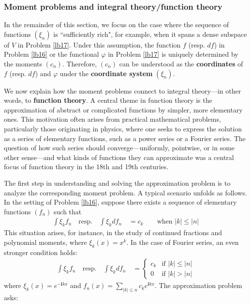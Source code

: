 \documentclass[12pt,b5paper,notitlepage]{article}
\theoremstyle{definition}
\theoremstyle{plain}
\newcommand{\im}{\mathbf{i}}
\numberwithin{equation}{section}
\begin{document}
\subsubsection{Moment problems and integral theory/function theory}\label{lb19}


In the remainder of this section, we focus on the case where the sequence of functions $(\xi_n)$ is ``sufficiently rich", for example, when it spans a dense subspace of $V$ in Problem \ref{lb17}. Under this assumption, the function $f$ (resp. $df$) in Problem \ref{lb16} or the functional $\varphi$ in Problem \ref{lb17} is uniquely determined by the moments $(c_n)$. Therefore, $(c_n)$ can be understood as the \textbf{coordinates} of $f$ (resp. $df$) and $\varphi$ under the \textbf{coordinate system} $(\xi_n)$.


We now explain how the moment problems connect to integral theory---in other words, to \textbf{function theory}. A central theme in function theory is the approximation of abstract or complicated functions by simpler, more elementary ones. This motivation often arises from practical mathematical problems, particularly those originating in physics, where one seeks to express the solution as a series of elementary functions, such as a power series or a Fourier series. The question of how such series should converge---uniformly, pointwise, or in some other sense---and what kinds of functions they can approximate was a central focus of function theory in the 18th and 19th centuries.


The first step in understanding and solving the approximation problem is to analyze the corresponding moment problem. A typical scenario unfolds as follows. In the setting of Problem \ref{lb16}, suppose there exists a sequence of elementary functions $(f_n)$ such that
\begin{align}\label{eq5}
\int \xi_k f_n\quad\text{resp.}\quad \int \xi_kdf_n\quad=c_k\qquad \text{when $|k|\leq |n|$}
\end{align}
This situation arises, for instance, in the study of continued fractions and polynomial moments, where $\xi_k(x)=x^k$. In the case of Fourier series, an even stronger condition holds:
\begin{align}\label{eq6}
\int \xi_k f_n\quad\text{resp.}\quad\int \xi_k df_n\quad=\left\{
\begin{array}{ll}
c_k&\text{if }|k|\leq |n|\\[0.5ex]
0&\text{if }|k|>|n|
\end{array}
\right.
\end{align}
where $\xi_k(x)=e^{-\im kx}$ and $f_n(x)=\sum_{|k|\leq n}c_k e^{\im kx}$. The approximation problem asks:
\end{document}
